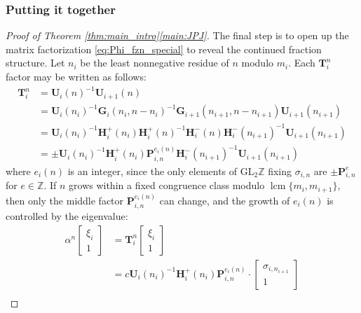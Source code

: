 \documentclass{article}
\numberwithin{equation}{section}
\theoremstyle{definition}
\theoremstyle{remark}
\DeclareMathOperator{\lcm}{lcm}
\newcommand{\GL}{\mathrm{GL}}
\newcommand{\ZZ}{\mathbb{Z}}
\newcommand{\<}{\left\langle}
\renewcommand{\>}{\right\rangle}
\begin{document}
\subsubsection{Putting it together}
\begin{proof}[Proof of Theorem \ref{thm:main_intro}\ref{main:JPJ}]
  The final step is to open up the matrix factorization \eqref{eq:Phi_fzn_special} to reveal the continued fraction structure. Let $n_i$ be the least nonnegative residue of $n$ modulo $m_i$. Each $\mathbf{T}_i^n$ factor may be written as follows:
  \begin{equation} \label{eq:T_6_factors}
    \begin{aligned}
      \mathbf{T}_i^n &= \mathbf{U}_i(n)^{-1} \mathbf{U}_{i+1}(n) \nonumber \\
      &= \mathbf{U}_i(n_i)^{-1} \mathbf{G}_i(n_i, n - n_i)^{-1} \mathbf{G}_{i+1}(n_{i+1}, n - n_{i+1}) \mathbf{U}_{i+1}(n_{i+1}) \nonumber \\
      &= \mathbf{U}_i(n_i)^{-1} \mathbf{H}_i^+(n_i) \mathbf{H}_i^+(n)^{-1} \mathbf{H}_i^-(n) \mathbf{H}_i^-(n_{i+1})^{-1} \mathbf{U}_{i+1}(n_{i+1}) \\
      &= \pm \mathbf{U}_i(n_i)^{-1} \mathbf{H}_i^+(n_i) \mathbf{P}_{i,n}^{e_i(n)} \mathbf{H}_i^-(n_{i+1})^{-1} \mathbf{U}_{i+1}(n_{i+1})
    \end{aligned}
  \end{equation}
  where $e_i(n)$ is an integer, since the only elements of $\GL_2\ZZ$ fixing $\sigma_{i, n}$ are $\pm \mathbf{P}_{i,n}^e$ for $e \in \ZZ$. If $n$ grows within a fixed congruence class modulo $\lcm\{m_i, m_{i+1}\}$, then only the middle factor $\mathbf{P}_{i,n}^{e_i(n)}$ can change, and the growth of $e_i(n)$ is controlled by the eigenvalue:
  \begin{equation}
    \begin{aligned}
      \alpha^n \begin{bmatrix}\xi_i \\ 1\end{bmatrix}
      &= \mathbf{T}_i^n \begin{bmatrix}\xi_i \\ 1\end{bmatrix} \\
      &= c \mathbf{U}_i(n_i)^{-1} \mathbf{H}_i^+(n_i) \mathbf{P}_{i,n}^{e_i(n)} \cdot \begin{bmatrix}
        \sigma_{i, n_{i+1}} \\ 1
      \end{bmatrix} \\

\end{aligned}
\end{equation}
\end{proof}
\end{document}
